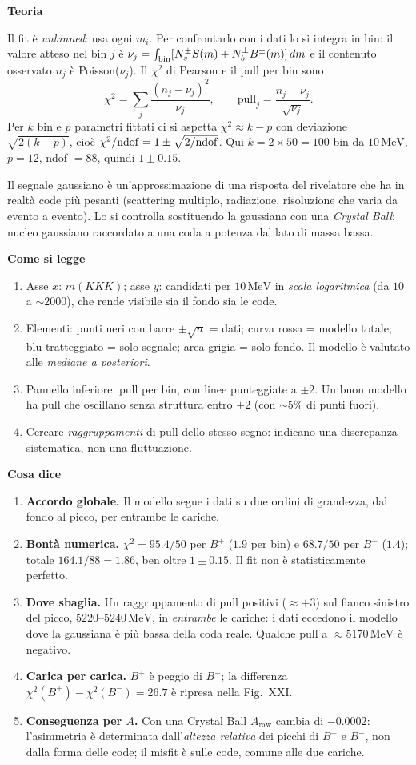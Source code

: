 \documentclass[10.5pt,a4paper]{article}
\newcommand{\Araw}{A_{\mathrm{raw}}}
\newcommand{\MeV}{\,\mathrm{MeV}}
\newcommand{\sez}[1]{\par\Needspace{6\baselineskip}\medskip\noindent\textbf{\large #1}\par\nopagebreak\smallskip}
\begin{document}
\sez{Teoria}
Il fit è \emph{unbinned}: usa ogni $m_i$. Per confrontarlo con i dati lo si integra in bin: il valore atteso nel bin $j$ è $\nu_j=\int_{\rm bin}[N_s^\pm S(m)+N_b^\pm B^\pm(m)]\,dm$ e il contenuto osservato $n_j$ è Poisson($\nu_j$). Il $\chi^2$ di Pearson e il pull per bin sono
\[
\chi^2=\sum_j\frac{(n_j-\nu_j)^2}{\nu_j},\qquad \text{pull}_j=\frac{n_j-\nu_j}{\sqrt{\nu_j}}.
\]
Per $k$ bin e $p$ parametri fittati ci si aspetta $\chi^2\approx k-p$ con deviazione $\sqrt{2(k-p)}$, cioè $\chi^2/{\rm ndof}=1\pm\sqrt{2/{\rm ndof}}$. Qui $k=2\times50=100$ bin da $10\MeV$, $p=12$, ndof $=88$, quindi $1\pm0.15$.

Il segnale gaussiano è un'approssimazione di una risposta del rivelatore che ha in realtà code più pesanti (scattering multiplo, radiazione, risoluzione che varia da evento a evento). Lo si controlla sostituendo la gaussiana con una \emph{Crystal Ball}: nucleo gaussiano raccordato a una coda a potenza dal lato di massa bassa.

\sez{Come si legge}
\begin{enumerate}
\item Asse $x$: $m(KKK)$; asse $y$: candidati per $10\MeV$ in \emph{scala logaritmica} (da $10$ a $\sim2000$), che rende visibile sia il fondo sia le code.
\item Elementi: punti neri con barre $\pm\sqrt n$ = dati; curva rossa = modello totale; blu tratteggiato = solo segnale; area grigia = solo fondo. Il modello è valutato alle \emph{mediane a posteriori}.
\item Pannello inferiore: pull per bin, con linee punteggiate a $\pm2$. Un buon modello ha pull che oscillano senza struttura entro $\pm2$ (con $\sim5\%$ di punti fuori).
\item Cercare \emph{raggruppamenti} di pull dello stesso segno: indicano una discrepanza sistematica, non una fluttuazione.
\end{enumerate}

\sez{Cosa dice}
\begin{enumerate}
\item \textbf{Accordo globale.} Il modello segue i dati su due ordini di grandezza, dal fondo al picco, per entrambe le cariche.
\item \textbf{Bontà numerica.} $\chi^2=95.4/50$ per $B^+$ ($1.9$ per bin) e $68.7/50$ per $B^-$ ($1.4$); totale $164.1/88=1.86$, ben oltre $1\pm0.15$. Il fit non è statisticamente perfetto.
\item \textbf{Dove sbaglia.} Un raggruppamento di pull positivi ($\approx+3$) sul fianco sinistro del picco, $5220$--$5240\MeV$, in \emph{entrambe} le cariche: i dati eccedono il modello dove la gaussiana è più bassa della coda reale. Qualche pull a $\approx5170\MeV$ è negativo.
\item \textbf{Carica per carica.} $B^+$ è peggio di $B^-$; la differenza $\chi^2(B^+)-\chi^2(B^-)=26.7$ è ripresa nella Fig.~XXI.
\item \textbf{Conseguenza per $A$.} Con una Crystal Ball $\Araw$ cambia di $-0.0002$: l'asimmetria è determinata dall'\emph{altezza relativa} dei picchi di $B^+$ e $B^-$, non dalla forma delle code; il misfit è sulle code, comune alle due cariche.
\end{enumerate}
\end{document}
